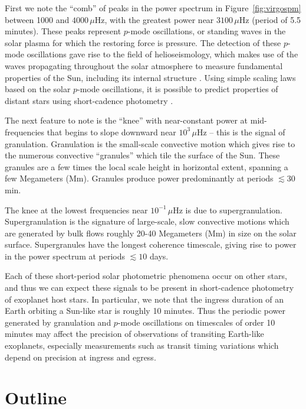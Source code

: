 First we note the ``comb'' of peaks in the power spectrum in Figure~\ref{fig:virgospm} between 1000 and $4000\,\mu$Hz, with the greatest power near $3100\,\mu$Hz (period of 5.5 minutes). These peaks represent $p$-mode oscillations, or standing waves in the solar plasma for which the restoring force is pressure. The detection of these $p$-mode oscillations gave rise to the field of helioseismology, which makes use of the waves propagating throughout the solar atmosphere to measure fundamental properties of the Sun, including its internal structure \citep{Christensen-Dalsgaard2002}. Using simple scaling laws based on the solar $p$-mode oscillations, it is possible to predict properties of distant stars using short-cadence photometry \citep[e.g.][]{Kjeldsen1995,Kjeldsen2011,Huber2011,Huber2012,Kallinger2014}.

The next feature to note is the ``knee'' with near-constant power at mid-frequencies that begins to slope downward near $10^{3}\,\mu$Hz -- this is the signal of granulation. Granulation is the small-scale convective motion which gives rise to the numerous convective ``granules'' which tile the surface of the Sun. These granules are a few times the local scale height in horizontal extent, spanning a few Megameters (Mm). Granules produce power predominantly at periods $\lesssim30$ min.

The knee at the lowest frequencies near $10^{-1}\,\mu$Hz is due to supergranulation. Supergranulation is the signature of large-scale, slow convective motions which are generated by bulk flows roughly 20-40 Megameters (Mm) in size on the solar surface. Supergranules have the longest coherence timescale, giving rise to power in the power spectrum at periods $\lesssim10$ days. 

Each of these short-period solar photometric phenomena occur on other stars, and thus we can expect these signals to be present in short-cadence photometry of exoplanet host stars. In particular, we note that the ingress duration of an Earth orbiting a Sun-like star is roughly 10 minutes. Thus the periodic power generated by granulation and $p$-mode oscillations on timescales of order 10 minutes may affect the precision of observations of transiting Earth-like exoplanets, especially measurements such as transit timing variations which depend on precision at ingress and egress.

\section{Outline} \label{sec:outline}

